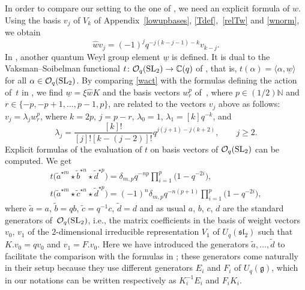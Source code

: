 \documentclass[10pt,a4paper]{amsart}
\numberwithin{equation}{section}
\theoremstyle{definition}
\newcommand{\mc}{\mathbb{C}}
\newcommand{\mn}{\mathbb{N}}
\newcommand{\Oo}{{\mathcal O}}
\newcommand{\ra}{\rightarrow}
\begin{document}
In order to compare our setting to the one of \cite{DC-L}, we need an explicit formula of $\hat{w}$.
Using the basis $v_j$ of $V_k$ of Appendix~\ref{lowupbases}, \eqref{Tdef},~\eqref{relTw} and \eqref{wnorm}, we obtain
\begin{equation}\label{wact}
\hat{w}{v}_j=(-1)^j q^{-j(k-j-1)-k}{v}_{k-j}.
\end{equation}
In \cite{DC-L}, another quantum Weyl group element $\underline{w}$ is defined. It is dual to the Vaksman--Soibelman functional $t\colon \Oo_q({\rm SL}_2)\ra \mc(q)$ of \cite{Soi,SV}, that is, $t(\alpha)=\langle \alpha , \underline{w} \rangle$ for all $\alpha \in \Oo_q({\rm SL}_2)$. By comparing \eqref{wact} with the formulas defining the action of~$t$ in \cite[Section~1.7]{DC-L}, we find $\underline{w}=\xi \hat{w}K$ and the basis vectors $w_r^p$ of~\cite{DC-L}, where $p\in (1/2)\mn$ and $r\in\{-p,-p+1,\dots,p-1,p\}$, are related to the vectors $v_j$ above as follows:
${v}_j=\lambda_j w_r^p$,
where $k=2p$, $j=p-r$, $\lambda_0=1$, $\lambda_1=[k]q^{-k}$, and
\[\lambda_j=\frac{[k]!}{[j]![k-(j-2)]!}q^{j(j+1)-j(k+2)}, \qquad j\geq 2.\]
Explicit formulas of the evaluation of $t$ on basis vectors of $\Oo_q({\rm SL}_2)$ can be computed. We get%
\begin{gather}
 t\big(\tilde{a}^{\star m}\star \tilde{b}^{\star n}\star \tilde{d}^{\star p}\big)=\delta_{m,p}q^{-np}\prod_{i=1}^{p}\big(1-q^{-2i}\big),\label{tform1}\\
 t\big(\tilde{a}^{\star m}\star \tilde{c}^{\star n}\star \tilde{d}^{\star p}\big)=(-1)^n\delta_{m,p}q^{-n(p+1)}\prod_{i=1}^{p}\big(1-q^{-2i}\big)\label{tform2},
\end{gather}
where $
\tilde{a} = a$, $\tilde{b} = q b$, $\tilde{c} = q^{-1}c$, $\tilde{d}=d$ and as usual $a$, $b$, $c$, $d$ are the standard generators of~$\mathcal{O}_q({\rm SL}_2)$, i.e., the matrix coefficients in the basis of weight vectors $v_0$, $v_1$ of the $2$-dimensional irreducible representation $V_1$ of $U_q({\mathfrak{sl}_2})$ such that $K.v_0=qv_0$ and $v_1=F.v_0$. Here we have introduced the generators $\tilde{a},\dots , \tilde{d}$ to facilitate the comparison with the formulas in \cite{DC-L}; these generators come naturally in their setup because they use different generators $E_i$ and $F_i$ of $U_q(\mathfrak{g})$, which in our notations can be written respectively as $K_i^{-1}E_i$ and $F_iK_i$.
\end{document}
